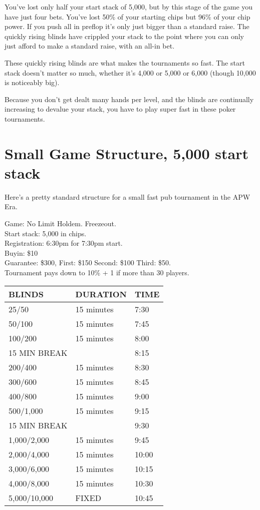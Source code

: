 You've lost only half your start stack of 5,000, but by this
stage of the game you have just four bets. You've lost 50\% of your
starting chips but 96\% of your chip power. If you push all
in preflop it's only just bigger than a standard raise. The quickly rising blinds have
crippled your stack to the point where you can only just afford to make
a standard raise, with an all-in bet.

These quickly rising blinds are what makes the tournaments so fast.
The start stack doesn't matter so much, whether it's 4,000 or 5,000
or 6,000 (though 10,000 is noticeably big).

Because you don't get dealt many hands per level, and the blinds are
continually increasing to devalue your stack, you have to play super fast
in these poker tournaments.

\section{Small Game Structure, 5,000 start stack}

Here's a pretty standard structure for a small fast pub tournament
in the APW Era.

Game: No Limit Holdem. Freezeout. \\
Start stack: 5,000 in chips. \\
Registration: 6:30pm for 7:30pm start. \\
Buyin: \$10 \\
Guarantee: \$300, First: \$150 Second: \$100 Third: \$50. \\
Tournament pays down to 10\% + 1 if more than 30 players.

\begin{tabular}{|l|l|l|} \hline
BLINDS  &  DURATION   & TIME \\ \hline
25/50   &  15 minutes & 7:30 \\ \hline
50/100  &  15 minutes & 7:45 \\ \hline
100/200 &  15 minutes & 8:00 \\ \hline
15 MIN BREAK &        & 8:15 \\ \hline
200/400 &  15 minutes & 8:30 \\ \hline
300/600 &  15 minutes & 8:45 \\ \hline
400/800 &  15 minutes & 9:00 \\ \hline
500/1,000 & 15 minutes & 9:15 \\ \hline
15 MIN BREAK  &        & 9:30 \\ \hline
1,000/2,000 & 15 minutes & 9:45 \\ \hline
2,000/4,000 & 15 minutes & 10:00 \\ \hline
3,000/6,000 & 15 minutes & 10:15 \\ \hline
4,000/8,000 & 15 minutes & 10:30 \\ \hline
5,000/10,000 & FIXED & 10:45 \\ \hline
\end{tabular}

